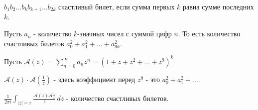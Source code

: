 \begin{example}
    $b_1b_2 \ldots b_k b_{k + 1} \ldots b_{2k}$ счастливый билет, если
    сумма первых $k$ равна сумме последних $k$.

    Пусть $a_n$ - количество $k$-значных чисел с суммой цифр $n$. То есть
    количество счастливых билетов $a_0^2 + a_1^2 + \ldots + a_{9k}^2$.

    Пусть $\mathcal{A}(z) = \sum_{n = 0}^{\infty} a_nz^n = (1 + z + z^2 + \ldots + z^9)^k$

    $\mathcal{A}(z) \cdot \mathcal{A}(\frac{1}{z})$ - здесь коэффициент перед $z^0$ - это $a_0^2 + a_1^2 + \ldots$.

    $\frac{1}{2\pi i} \int_{|z| = r} \frac{\mathcal{A}(z) \mathcal{A}\frac{1}{z}}{z} \, dz$ - количество счастливых билетов.
\end{example}

